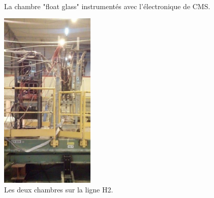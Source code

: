 \begin{figure}[ht]
	 \hfill
	{\,}
	\caption{La chambre "float glass" instrumentés avec l'électronique de CMS.}
	\label{chambrefloat}
\end{figure}

\newpage
\begin{figure}
	\centering
	\includegraphics[width=0.40\textwidth]{GLA/GCH2.png}
	\caption{Les deux chambres sur la ligne H2.}
	\label{GCH2}
\end{figure}

